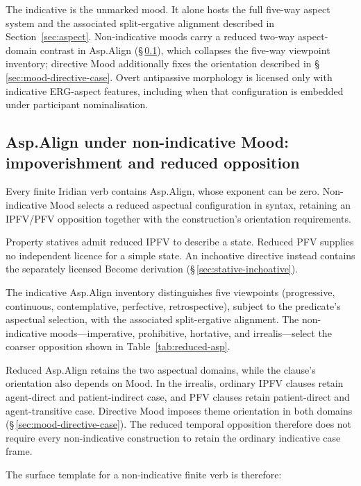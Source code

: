The indicative is the unmarked mood. It alone hosts the full five-way aspect
system and the associated split-ergative alignment described in
Section~\ref{sec:aspect}. Non-indicative moods carry a reduced two-way
aspect-domain contrast in Asp.Align (§\,\ref{sec:vm-mood-asp}), which collapses
the five-way viewpoint inventory; directive Mood additionally fixes the
orientation described in §\,\ref{sec:mood-directive-case}. Overt antipassive morphology is licensed only
with indicative ERG-aspect features, including when that configuration is
embedded under participant nominalisation.

\subsection{Asp.Align under non-indicative Mood: impoverishment and reduced opposition}
\label{sec:vm-mood-asp}

Every finite Iridian verb contains Asp.Align, whose exponent can be zero.
Non-indicative Mood selects a reduced aspectual configuration in syntax,
retaining an IPFV/PFV opposition together with the construction's orientation
requirements.

Property statives admit reduced IPFV to describe a state. Reduced PFV
supplies no independent licence for a simple state. An inchoative directive
instead contains the separately licensed Become derivation
(§\,\ref{sec:stative-inchoative}).

The indicative Asp.Align inventory distinguishes five viewpoints
(progressive, continuous, contemplative, perfective, retrospective), subject
to the predicate's aspectual selection, with the associated split-ergative
alignment. The non-indicative moods---imperative,
prohibitive, hortative, and irrealis---select the coarser
 opposition shown in
Table~\ref{tab:reduced-asp}.



Reduced Asp.Align retains the two aspectual domains, while the clause's
orientation also depends on Mood. In the irrealis, ordinary IPFV clauses retain
agent-direct and patient-indirect case, and PFV clauses retain patient-direct
and agent-transitive case. Directive Mood imposes theme orientation in both
domains (§\,\ref{sec:mood-directive-case}). The reduced temporal opposition
therefore does not require every non-indicative construction to retain the
ordinary indicative case frame.

The surface template for a non-indicative finite verb is therefore:

